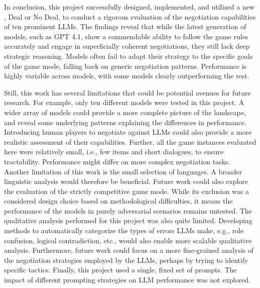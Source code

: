 In conclusion, this project successfully designed, implemented, and utilized a new , Deal or No Deal, to conduct a rigorous evaluation of the negotiation capabilities of ten prominent LLMs. The findings reveal that while the latest generation of models, such as GPT 4.1, show a commendable ability to follow the game rules accurately and engage in superficially coherent negotiations, they still lack deep strategic reasoning. Models often fail to adapt their strategy to the specific goals of the game mode, falling back on generic negotiation patterns. Performance is highly variable across models, with some models clearly outperforming the rest.

Still, this work has several limitations that could be potential avenues for future research. For example, only ten different models were tested in this project. A wider array of models could provide a more complete picture of the landscape, and reveal some underlying patterns explaining the differences in performance. Introducing human players to negotiate against LLMs could also provide a more realistic assessment of their capabilities. Further, all the game instances evaluated here were relatively small, i.e., few items and short dialogues, to ensure tractability. Performance might differ on more complex negotiation tasks. Another limitation of this work is the small selection of languages. A broader linguistic analysis would therefore be beneficial. Future work could also explore the evaluation of the strictly competitive game mode. While its exclusion was a considered design choice based on methodological difficulties, it means the performance of the models in purely adversarial scenarios remains untested. The qualitative analysis performed for this project was also quite limited. Developing methods to automatically categorize the types of errors LLMs make, e.g., role confusion, logical contradiction, etc., would also enable more scalable qualitative analysis. Furthermore, future work could focus on a more fine-grained analysis of the negotiation strategies employed by the LLMs, perhaps by trying to identify specific tactics. Finally, this project used a single, fixed set of prompts. The impact of different prompting strategies on LLM performance was not explored. 


